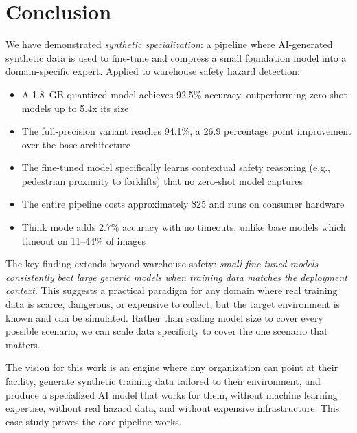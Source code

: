 \documentclass[12pt, a4paper]{article}
\begin{document}
\section{Conclusion}

We have demonstrated \textit{synthetic specialization}: a pipeline where AI-generated synthetic data is used to fine-tune and compress a small foundation model into a domain-specific expert. Applied to warehouse safety hazard detection:

\begin{itemize}
    \item A 1.8~GB quantized model achieves 92.5\% accuracy, outperforming zero-shot models up to 5.4x its size
    \item The full-precision variant reaches 94.1\%, a 26.9 percentage point improvement over the base architecture
    \item The fine-tuned model specifically learns contextual safety reasoning (e.g., pedestrian proximity to forklifts) that no zero-shot model captures
    \item The entire pipeline costs approximately \$25 and runs on consumer hardware
    \item Think mode adds 2.7\% accuracy with no timeouts, unlike base models which timeout on 11--44\% of images
\end{itemize}

The key finding extends beyond warehouse safety: \textit{small fine-tuned models consistently beat large generic models when training data matches the deployment context}. This suggests a practical paradigm for any domain where real training data is scarce, dangerous, or expensive to collect, but the target environment is known and can be simulated. Rather than scaling model size to cover every possible scenario, we can scale data specificity to cover the one scenario that matters.

The vision for this work is an engine where any organization can point at their facility, generate synthetic training data tailored to their environment, and produce a specialized AI model that works for them, without machine learning expertise, without real hazard data, and without expensive infrastructure. This case study proves the core pipeline works.
\end{document}
